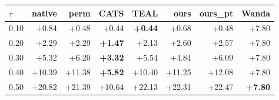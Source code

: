 \begin{tabular}{lrrrrrrr}
\toprule
$\tau$ & native & perm & CATS & TEAL & ours & ours\_pt & Wanda \\
\midrule
0.10 & +0.84 & +0.48 & +0.44 & \textbf{+0.44} & +0.68 & +0.48 & +7.80 \\
0.20 & +2.29 & +2.29 & \textbf{+1.47} & +2.13 & +2.60 & +2.57 & +7.80 \\
0.30 & +5.32 & +6.20 & \textbf{+3.32} & +5.54 & +4.84 & +6.09 & +7.80 \\
0.40 & +10.39 & +11.38 & \textbf{+5.82} & +10.40 & +11.25 & +12.08 & +7.80 \\
0.50 & +20.82 & +21.39 & +10.64 & +22.13 & +22.31 & +22.47 & \textbf{+7.80} \\
\bottomrule
\end{tabular}

